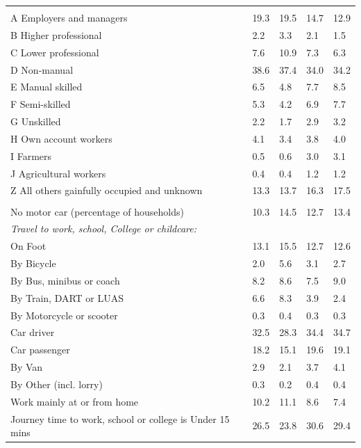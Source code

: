 \documentclass{article}
\begin{document}
\begin{table}[h]
\begin{tabular}{KTTTT}
\hline
    \\ 
    \hline
A Employers and managers & 19.3& 19.5& 14.7& 12.9\\
B Higher professional & 2.2& 3.3& 2.1& 1.5\\
C Lower professional &  7.6& 10.9&  7.3&  6.3\\
D Non-manual & 38.6& 37.4& 34.0& 34.2\\
E Manual skilled & 6.5& 4.8& 7.7& 8.5\\
F Semi-skilled & 5.3& 4.2& 6.9& 7.7\\
G Unskilled & 2.2& 1.7& 2.9& 3.2\\
H Own account workers & 4.1& 3.4& 3.8& 4.0\\
I Farmers & 0.5& 0.6& 3.0& 3.1\\
J Agricultural workers & 0.4& 0.4& 1.2& 1.2\\
Z All others gainfully occupied and unknown & 13.3& 13.7& 16.3& 17.5\\
\hline
{}\hline
    \\ 
    \hline
No motor car (percentage of households) & 10.3& 14.5& 12.7& 
13.4\\
    \hline 
\emph{Travel to work, school, College or childcare:} & & & \\
\quad On Foot & 13.1& 15.5& 12.7& 12.6\\ 
\quad By Bicycle & 2.0& 5.6& 3.1& 2.7\\ 
\quad By Bus, minibus or coach & 8.2& 8.6& 7.5& 9.0\\
\quad By Train, DART or LUAS & 6.6& 8.3& 3.9& 2.4\\
\quad By Motorcycle or scooter & 0.3& 0.4& 0.3& 0.3\\
\quad Car driver & 32.5 & 28.3& 34.4& 34.7\\
\quad Car passenger & 18.2& 15.1& 19.6& 19.1\\
\quad By Van & 2.9& 2.1& 3.7& 4.1\\
\quad By Other (incl. lorry) & 0.3& 0.2& 0.4& 0.4\\
    \hline
Work mainly at or from home & 10.2& 11.1&  8.6&  7.4\\
Journey time to work, school or college is Under 15 mins & 26.5& 23.8& 30.6& 29.4\\

\end{tabular}
\end{table}
\end{document}
